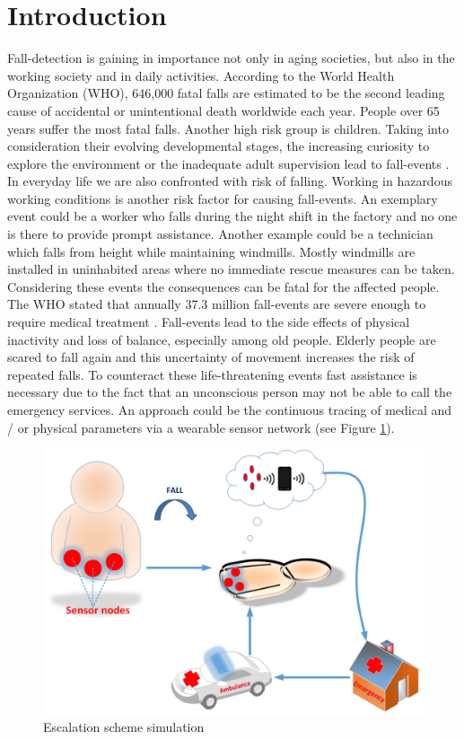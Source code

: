 \documentclass[review]{elsarticle}
\begin{document}

\section{Introduction}
\label{sec:introduction}
Fall-detection is gaining in importance not only in aging societies, but also in the working society and in daily activities. According to the World Health Organization (WHO), 646,000 fatal falls are estimated to be the second leading cause of accidental or unintentional death worldwide each year. People over 65 years suffer the most fatal falls. Another high risk group is children. Taking into consideration their evolving developmental stages, the increasing curiosity to explore the environment or the inadequate adult supervision lead to fall-events \cite{WHO2018}.
In everyday life we are also confronted with risk of falling. Working in hazardous working conditions is another risk factor for causing fall-events. An exemplary event could be a worker who falls during the night shift in the factory and no one is there to provide prompt assistance. Another example could be a technician which falls from height while maintaining windmills. Mostly windmills are installed in uninhabited areas where no immediate rescue measures can be taken. Considering these events the consequences can be fatal for the affected people. 
The WHO stated that annually 37.3 million fall-events are severe enough to require medical treatment \cite{WHO2018}. Fall-events lead to the side effects of physical inactivity and loss of balance, especially among old people. Elderly people are scared to fall again and this uncertainty of movement increases the risk of repeated falls. 
To counteract these life-threatening events fast assistance is necessary due to the fact that an unconscious person may not be able to call the emergency services. An approach could be the continuous tracing of medical and / or physical parameters via a wearable sensor network (see Figure \ref{fig:escalationscheme}).
\begin{figure}[!ht]
	\centering
	\includegraphics[scale=0.38]{Images/EscalationScheme}
	\caption[Escalation scheme]{Escalation scheme simulation~\cite{LaBlunda.2016,LaBlunda.2016b}}
	\label{fig:escalationscheme}
\end{figure}
\end{document}
